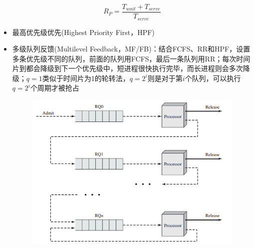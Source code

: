 \begin{itemize}
\[R_P=\frac{T_{wait}+T_{serve}}{T_{serve}}\]
\item 最高优先级优先(Highest Priority First，HPF)
\item 多级队列反馈(Multilevel Feedback，MF/FB)：结合FCFS、RR和HPF，设置多条优先级不同的队列，前面的队列用FCFS，最后一条队列用RR；每次时间片到都会降级到下一个优先级中，短进程很快执行完毕，而长进程则会多次降级；$q=1$类似于时间片为1的轮转法，$q=2^i$则是对于第$i$个队列，可以执行$q=2^i$个周期才被抢占
\begin{figure}[H]
    \centering
    \includegraphics[width=0.6\linewidth]{fig/feedback.png}
\end{figure}
\end{itemize}

